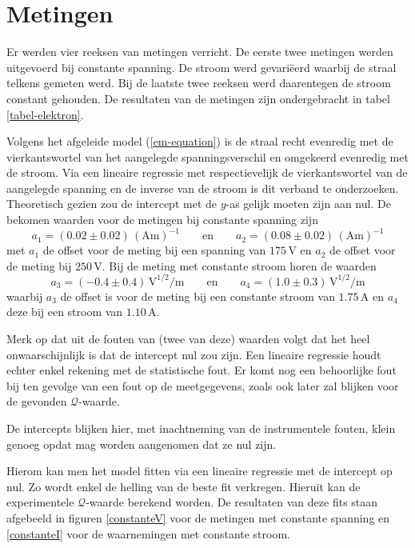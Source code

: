 \section{Metingen}


Er werden vier reeksen van metingen verricht. De eerste twee metingen 
werden uitgevoerd bij constante spanning. De stroom werd gevari\"eerd 
waarbij de straal telkens gemeten werd. Bij de laatste twee reeksen werd 
daarentegen de stroom constant gehouden. De resultaten van de metingen zijn 
ondergebracht in tabel \ref{tabel-elektron}.

Volgens het afgeleide model (\ref{em-equation}) is de straal recht 
evenredig met de vierkantswortel van het aangelegde spanningsverschil en 
omgekeerd evenredig met de stroom. Via een lineaire regressie met 
respectievelijk de vierkantswortel van de aangelegde spanning en de inverse 
van de stroom is dit verband te onderzoeken. Theoretisch gezien zou de 
intercept met de $y$-as gelijk moeten zijn aan nul.  De bekomen waarden 
voor de metingen bij constante spanning zijn
$$
a_1 = (0.02 \pm 0.02)\,(\textrm{Am})^{-1}
\qquad \textrm{en} \qquad
a_2 = (0.08 \pm 0.02)\,(\textrm{Am})^{-1}
$$
met $a_1$ de offset voor de meting bij een spanning van $175$\,V en $a_2$ de 
offset voor de meting bij $250$\,V. Bij de meting met constante stroom horen de 
waarden
$$
a_3 = (-0.4 \pm 0.4)\,\textrm{V}^{1/2}\textrm{/m}
\qquad \textrm{en} \qquad
a_4 = (1.0 \pm 0.3)\,\textrm{V}^{1/2}\textrm{/m}
$$
waarbij $a_3$ de offset is voor de meting bij een constante stroom van 
$1.75$\,A en $a_4$ deze bij een stroom van $1.10$\,A.

Merk op dat uit de fouten van (twee van deze) waarden volgt dat het heel 
onwaarschijnlijk is dat de intercept nul zou zijn. Een lineaire regressie 
houdt echter enkel rekening met de statistische fout. Er komt nog een 
behoorlijke fout bij ten gevolge van een fout op de meetgegevens, zoals ook 
later zal blijken voor de gevonden $\mathcal{Q}$-waarde.

De intercepts blijken hier, met inachtneming van de instrumentele fouten, 
klein genoeg opdat mag worden aangenomen dat ze nul zijn.

Hierom kan men het model fitten via een lineaire regressie met de intercept op 
nul. Zo wordt enkel de helling van de beste fit verkregen. Hieruit kan de 
experimentele $\mathcal{Q}$-waarde berekend worden. De resultaten van deze fits 
staan afgebeeld in figuren \ref{constanteV} voor de metingen met constante 
spanning en \ref{constanteI} voor de waarnemingen met constante stroom.

